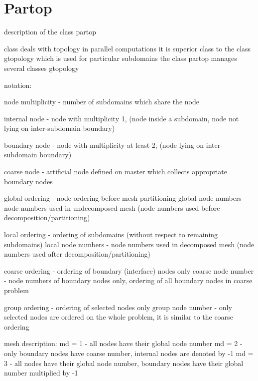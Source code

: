 \chapter{Partop}

description of the class partop

   class deals with topology in parallel computations
   it is superior class to the class gtopology which is used
   for particular subdomains
   the class partop manages several classes gtopology
   
   
   notation:

   node multiplicity - number of subdomains which share the node

   internal node - node with multiplicity 1, (node inside a subdomain,
		   node not lying on inter-subdomain boundary)

   boundary node - node with multiplicity at least 2, (node lying
                   on inter-subdomain boundary)

   coarse node - artificial node defined on master which collects appropriate
                 boundary nodes

   
   global ordering - node ordering before mesh partitioning
   global node numbers - node numbers used in undecomposed mesh
                        (node numbers used before decomposition/partitioning)

   local ordering - ordering of subdomains (without respect to remaining subdomains)
   local node numbers - node numbers used in decomposed mesh
                        (node numbers used after decomposition/partitioning)

   coarse ordering - ordering of boundary (interface) nodes only
   coarse node number - node numbers of boundary nodes only, ordering
                        of all boundary nodes in coarse problem

   group ordering - ordering of selected nodes only
   group node number - only selected nodes are ordered on the whole problem, it is similar to
                       the coarse ordering


   mesh description:
   md = 1 - all nodes have their global node number
   md = 2 - only boundary nodes have coarse number, internal nodes are denoted by -1
   md = 3 - all nodes have their global node number, boundary nodes have their global number multiplied by -1


